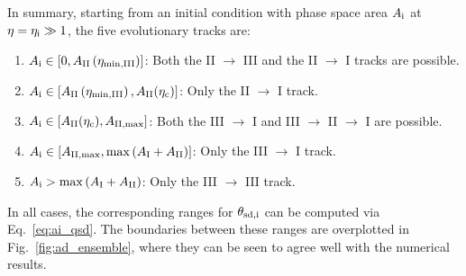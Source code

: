 In summary, starting from an initial condition with phase space area $A_{\rm i}$
at $\eta = \eta_{\rm i} \gg 1$, the five evolutionary tracks are:
\begin{enumerate}
    \item $A_{\rm i} \in \left[0, A_{\rm II}\left(\eta_{\rm \min, III}\right)\right]$: Both the II
        $\to$ III and the II $\to$ I tracks are possible.

    \item $A_{\rm i} \in \left[A_{\rm II}\left(\eta_{\rm \min, III}\right), A_{\rm
        II}(\eta_{\rm c})\right]$: Only the II $\to$ I track.

    \item $A_{\rm i} \in \left[A_{\rm II}(\eta_{\rm c}), A_{\rm II, \max}\right]$:
        Both the III $\to$ I and III $\to$ II $\to$ I are possible.

    \item $A_{\rm i} \in \left[A_{\rm II, \max}, \max \left(A_{\rm I} + A_{\rm II}\right)\right]$:
        Only the III $\to$ I track.

    \item $A_{\rm i} > \max \left(A_{\rm I} + A_{\rm II}\right)$: Only the III $\to$ III
        track.
\end{enumerate}
In all cases, the corresponding ranges for $\theta_{\rm sd,i}$ can be computed via
Eq.~\eqref{eq:ai_qsd}. The boundaries between these ranges are overplotted in
Fig.~\ref{fig:ad_ensemble}, where they can be seen to agree well with the
numerical results.
